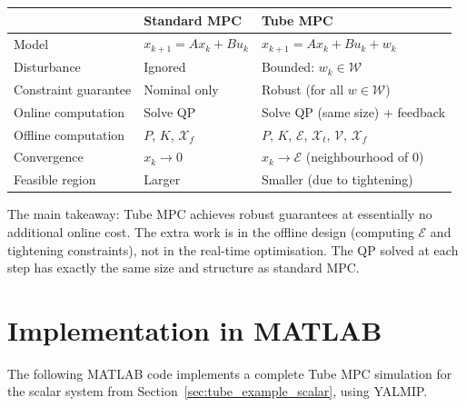 \begin{center}
	\begin{tabular}{L{4cm} C{4.5cm} C{4.5cm}}
		\toprule
		& \textbf{Standard MPC} & \textbf{Tube MPC} \\
		\midrule
		Model & $x_{k+1} = Ax_k + Bu_k$ & $x_{k+1} = Ax_k + Bu_k + w_k$ \\[3pt]
		Disturbance & Ignored & Bounded: $w_k \in \mathcal{W}$ \\[3pt]
		Constraint guarantee & Nominal only & Robust (for all $w \in \mathcal{W}$) \\[3pt]
		Online computation & Solve QP & Solve QP (same size) + feedback \\[3pt]
		Offline computation & $P$, $K$, $\mathcal{X}_f$ & $P$, $K$, $\mathcal{E}$, $\mathcal{X}_t$, $\mathcal{V}$, $\mathcal{X}_f$ \\[3pt]
		Convergence & $x_k \to 0$ & $x_k \to \mathcal{E}$ (neighbourhood of 0) \\[3pt]
		Feasible region & Larger & Smaller (due to tightening) \\
		\bottomrule
	\end{tabular}
\end{center}

The main takeaway: Tube MPC achieves robust guarantees at essentially no additional online cost. The extra work is in the offline design (computing $\mathcal{E}$ and tightening constraints), not in the real-time optimisation. The QP solved at each step has exactly the same size and structure as standard MPC.


\section{Implementation in MATLAB}
\label{sec:tube_matlab}

The following MATLAB code implements a complete Tube MPC simulation for the scalar system from Section~\ref{sec:tube_example_scalar}, using YALMIP.

